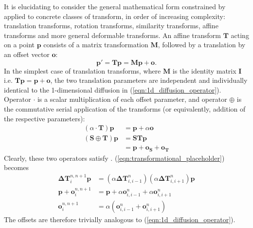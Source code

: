 	  It is elucidating to consider the general mathematical form constrained by  applied to concrete classes of transform, in order of increasing complexity: translation transforms, rotation transforms, similarity transforms, affine transforms and more general deformable transforms. An affine transform $\mathbf{T}$ acting on a point $\mathbf{p}$ consists of a matrix transformation $\mathbf{M}$, followed by a translation by an offset vector $\mathbf{o}$:
		\begin{equation}
			\mathbf{p'} = \mathbf{Tp}= \mathbf{Mp} + \mathbf{o}.
		\end{equation}
		In the simplest case of translation transforms, where $\mathbf{M}$ is the identity matrix $\mathbf{I}$ i.e. $\mathbf{Tp} = \mathbf{p} + \mathbf{o}$, the two translation parameters are independent and individually identical to the 1-dimensional diffusion in (\ref{eqn:1d_diffusion_operator}). Operator $\cdot$ is a scalar multiplication of each offset parameter, and operator $\oplus$ is the commutative serial application of the transforms (or equivalently, addition of the respective parameters):
		\begin{align}
			(\alpha \cdot \mathbf{T}) \mathbf{p} &= \mathbf{p} + \alpha\mathbf{o} \label{eqn:translation_cdot}\\
			(\mathbf{S} \oplus \mathbf{T}) \mathbf{p} &= \mathbf{STp} \\
			                                          &= \mathbf{p} + \mathbf{o_S} + \mathbf{o_T} \label{eqn:translation_oplus}
		\end{align}
		Clearly, these two operators satisfy . (\ref{eqn:transformational_placeholder}) becomes
		\begin{align}
		 	\mathbf{\Delta T}_i^{n,n+1} \mathbf{p} &= (\alpha \mathbf{\Delta T}_{i,i-1}^n) (\alpha \mathbf{\Delta T}_{i,i+1}^n) \mathbf{p} \\
			\mathbf{p} + \mathbf{o}_i^{n,n+1} &= \mathbf{p} + \alpha \mathbf{o}_{i,i-1}^n + \alpha \mathbf{o}_{i,i+1}^n \\
			\mathbf{o}_i^{n,n+1} &= \alpha (\mathbf{o}_{i,i-1}^n + \mathbf{o}_{i,i+1}^n) 
		\end{align}
		The offsets are therefore trivially analogous to (\ref{eqn:1d_diffusion_operator}).
		
